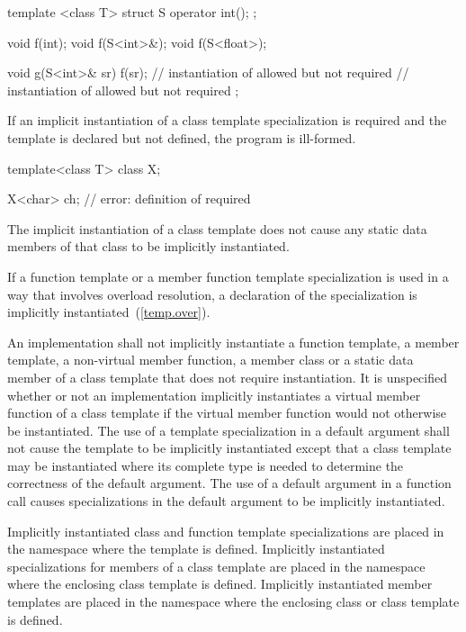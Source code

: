 \begin{codeblock}
template <class T> struct S {
	operator int();
};

void f(int);
void f(S<int>&);
void f(S<float>);

void g(S<int>& sr) {
	f(sr);			// instantiation of  allowed but not required
				// instantiation of  allowed but not required
};
\end{codeblock}
\exitexampleb

\pnum
If an implicit instantiation of a class template specialization is required and
the template is declared but not defined, the program is ill-formed.
\enterexample

\begin{codeblock}
template<class T> class X;

X<char> ch;			// error: definition of  required
\end{codeblock}
\exitexampleb

\pnum
The implicit instantiation of a class template does not cause any static data
members of that class to be implicitly instantiated.

\pnum
If a function template or a member function template specialization is used in
a way that involves overload resolution,
a declaration of the specialization is implicitly instantiated~(\ref{temp.over}).

\pnum
An implementation shall not implicitly instantiate a function template,
a member template, a non-virtual member function, a member class or a
static data member of a class template that does not require instantiation.
It is unspecified whether or not an implementation implicitly instantiates a
virtual member function of a class template if the virtual member function would
not otherwise be instantiated.
The use of a template specialization in a default argument
shall not cause the template to be implicitly instantiated except that a
class template may be instantiated where its complete type is needed to determine
the correctness of the default argument.
The use of a default argument in a
function call causes specializations in the default argument to be implicitly
instantiated.

\pnum
Implicitly instantiated class and function template specializations are placed
in the namespace where the template is defined.
Implicitly instantiated specializations for members of a class template are
placed in the namespace where the enclosing class template is defined.
Implicitly instantiated member templates are placed in the namespace where the
enclosing class or class template is defined.
\enterexample

